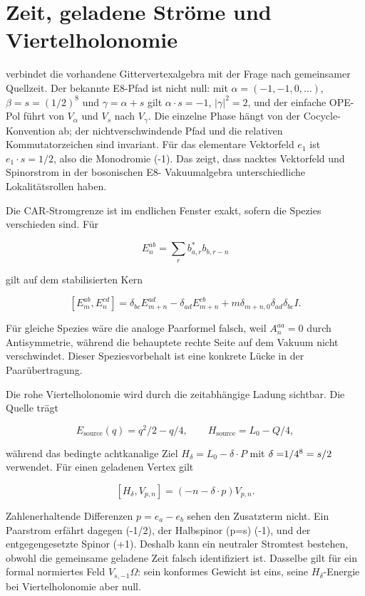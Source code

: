 \section{Zeit, geladene Ströme und Viertelholonomie}

 verbindet die vorhandene Gittervertexalgebra mit
der Frage nach gemeinsamer Quellzeit. Der bekannte E8-Pfad ist nicht null:
mit \(\alpha=(-1,-1,0,\ldots)\), \(\beta=s=(1/2)^8\) und
\(\gamma=\alpha+s\) gilt \(\alpha\cdot s=-1\), \(\lvert\gamma\rvert^2=2\), und der
einfache OPE-Pol führt von \(V_\alpha\) und \(V_s\) nach \(V_\gamma\).
Die einzelne Phase hängt von der Cocycle-Konvention ab; der nichtverschwindende
Pfad und die relativen Kommutatorzeichen sind invariant. Für das elementare
Vektorfeld \(e_1\) ist \(e_1\cdot s=1/2\), also die Monodromie (-1). Das
zeigt, dass nacktes Vektorfeld und Spinorstrom in der bosonischen E8-
Vakuumalgebra unterschiedliche Lokalitätsrollen haben.

Die CAR-Stromgrenze ist im endlichen Fenster exakt, sofern die Spezies
verschieden sind. Für

\[
 E_n^{ab}=\sum_r b^*_{a,r}b_{b,r-n}
\]

gilt auf dem stabilisierten Kern

\[
 [E_m^{ab},E_n^{cd}]
 =\delta_{bc}E_{m+n}^{ad}-\delta_{ad}E_{m+n}^{cb}
 +m\delta_{m+n,0}\delta_{ad}\delta_{bc}I.
\]

Für gleiche Spezies wäre die analoge Paarformel falsch, weil
\(A_n^{aa}=0\) durch Antisymmetrie, während die behauptete rechte Seite auf
dem Vakuum nicht verschwindet. Dieser Speziesvorbehalt ist eine konkrete
Lücke in der Paarübertragung.

Die rohe Viertelholonomie wird durch die zeitabhängige Ladung sichtbar. Die
Quelle trägt

\[
 E_\mathrm{source}(q)=q^2/2-q/4,
 \qquad H_\mathrm{source}=L_0-Q/4,
\]

während das bedingte achtkanalige Ziel \(H_\delta=L_0-\delta\cdot P\) mit
\(\delta=$1/4$^8=s/2\) verwendet. Für einen geladenen Vertex gilt

\[
 [H_\delta,V_{p,n}]=(-n-\delta\cdot p)V_{p,n}.
\]

Zahlenerhaltende Differenzen \(p=e_a-e_b\) sehen den Zusatzterm nicht. Ein
Paarstrom erfährt dagegen (-1/2), der Halbspinor (p=s) (-1), und der
entgegengesetzte Spinor (+1). Deshalb kann ein neutraler Stromtest bestehen,
obwohl die gemeinsame geladene Zeit falsch identifiziert ist. Dasselbe gilt
für ein formal normiertes Feld \(V_{s,-1}\Omega\): sein konformes Gewicht ist
eins, seine \(H_\delta\)-Energie bei Viertelholonomie aber null.

